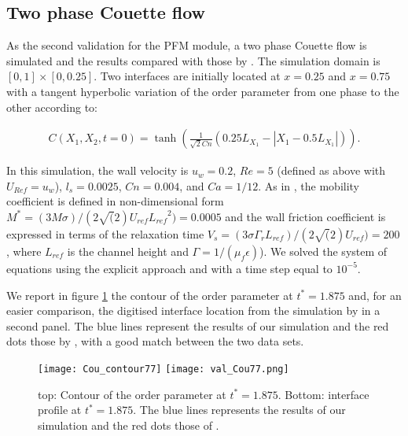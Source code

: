 \documentclass[review]{elsarticle}
\begin{document}
\subsection{Two phase Couette flow}
As the second validation for the PFM module, a two phase Couette flow is simulated and the results compared with those by \cite{Bao2012}. The simulation domain is $[0,1] \times [0,0.25]$. Two interfaces are initially located at $x=0.25$ and $x=0.75$ with a tangent hyperbolic variation of the order parameter from one phase to the other according to:
\begin{linenomath}\begin{equation} \label{InitializingC}
\begin{gathered}
 C(X_1,X_2,t=0) = \tanh \left( \frac{1}{\sqrt 2 Cn}(0.25 L_{X_1}- |X_1-0.5 L_{X_1}|) \right).
 \end{gathered}
\end{equation}\end{linenomath}
In this simulation, the wall velocity is $u_w=0.2$, $Re=5$ (defined as above with $U_{Ref}=u_w$), $l_s=0.0025$, $Cn=0.004$, and $ Ca=1/12$. As in \cite{Bao2012}, the mobility coefficient is defined in non-dimensional form $M^*= (3M\sigma)/(2\sqrt(2)U_{ref} {L_{ref}}^2)=0.0005$ and the wall friction coefficient is expressed in terms of the relaxation time $V_s= (3\sigma \Gamma_r L_{ref})/(2\sqrt(2) U_{ref})=200$, where $L_{ref}$ is the channel height and $\Gamma = 1/(\mu_f \epsilon)$).  We solved the system of equations using the explicit approach and with a time step equal to $10^{-5}$.

We report in figure \ref{CouetteContour} the contour of the order parameter at $t^*=1.875$ and, for an easier comparison, the digitised interface location from the simulation by \cite{Bao2012} in a second panel. The blue lines represent the results of our simulation and the red dots those by \cite{Bao2012}, with a good match between the two data sets. 
 \begin{figure}[H]
\centering
\texttt{[image: Cou\_contour77]}
\texttt{[image: val\_Cou77.png]}
\caption{top: Contour of the order parameter at $t^*=1.875$. Bottom: interface profile at $t^*=1.875$. The blue lines represents the results of our simulation and the red dots those of \cite{Bao2012}. }
\label{CouetteContour}
\end{figure}
\end{document}
